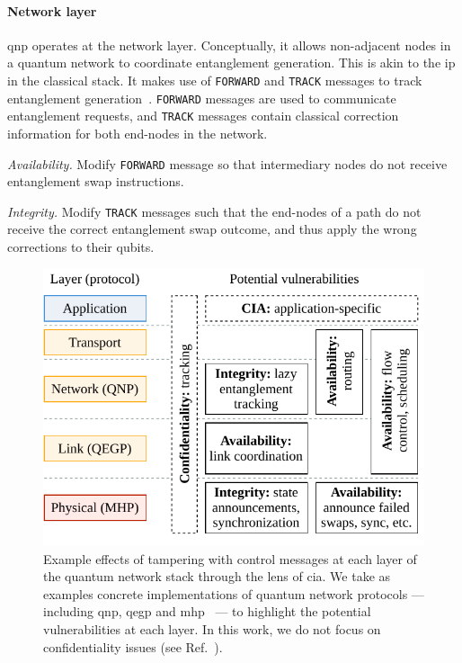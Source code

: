\paragraph{Network layer}

\acrshort{qnp} operates at the network layer. Conceptually, it allows non-adjacent nodes in a
quantum network to coordinate entanglement generation. This is akin to the \acrfull{ip} in the
classical stack. It makes use of \texttt{FORWARD} and \texttt{TRACK} messages to track entanglement
generation~\cite[Figure 6]{kozlowski_2020_qnp}. \texttt{FORWARD} messages are used to communicate
entanglement requests, and \texttt{TRACK} messages contain classical correction information for both
end-nodes in the network.

\begin{example}
\textit{Availability.}
Modify \texttt{FORWARD} message so that intermediary nodes do not receive entanglement swap
instructions.
\end{example}

\begin{example}
\textit{Integrity.}
Modify \texttt{TRACK} messages such that the end-nodes of a path do not receive the correct
entanglement swap outcome, and thus apply the wrong corrections to their qubits.
\end{example}

\begin{figure}[t]
    \centering
    \includegraphics[width=0.6\linewidth]{figures/doa-examples.pdf}
    \caption{
        Example effects of tampering with control messages at each layer of the quantum network
        stack through the lens of \acrfull{cia}. We take as examples concrete implementations of
        quantum network protocols --- including \acrshort{qnp}, \acrshort{qegp} and
        \acrshort{mhp}~\cite{kozlowski_2020_qnp, dahlberg_2019_egp} --- to highlight the potential
        vulnerabilities at each layer. In this work, we do not focus on confidentiality issues (see
        Ref.~\cite{satoh_2020_attacking}).
    }
    \label{fig:doa-examples}
\end{figure}

